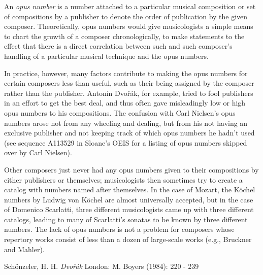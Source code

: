 \documentclass[12pt]{article}
\begin{document}
An {\em opus number} is a number attached to a particular musical composition or set of compositions by a publisher to denote the order of publication by the given composer. 
Theoretically, opus numbers would give musicologists a simple means to chart the growth of a composer chronologically, to make statements to the effect that there is a direct correlation between such and such composer's handling of a particular musical technique and the opus numbers.

In practice, however, many factors contribute to making the opus numbers for certain composers less than useful, such as their being assigned by the composer rather than the publisher. Anton\'in Dvo\v{r}\'ak, for example, tried to fool publishers in an effort to get the best deal, and thus often gave misleadingly low or high opus numbers to his compositions. The confusion with Carl Nielsen's opus numbers arose not from any wheeling and dealing, but from his not having an exclusive publisher and not keeping track of which opus numbers he hadn't used (see sequence A113529 in Sloane's OEIS for a listing of opus numbers skipped over by Carl Nielsen).

Other composers just never had any opus numbers given to their compositions by either publishers or themselves; musicologists then sometimes try to create a catalog with numbers named after themselves. In the case of Mozart, the K\"ochel numbers by Ludwig von K\"ochel are almost universally accepted, but in the case of Domenico Scarlatti, three different musicologists came up with three different catalogs, leading to many of Scarlatti's sonatas to be known by three different numbers. The lack of opus numbers is not a problem for composers whose repertory works consist of less than a dozen of large-scale works (e.g., Bruckner and Mahler).

\begin{thebibliography}{1}
 Sch\"onzeler, H. H. {\it Dvo\v{r}\'ak} London: M. Boyers (1984): 220 - 239
\end{thebibliography}
\end{document}
